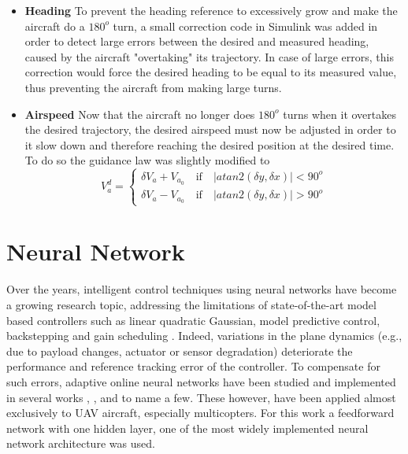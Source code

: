 \begin{itemize}
\item \textbf{Heading} To prevent the heading reference to excessively grow and make the aircraft do a $180^o$ turn, a small correction code in Simulink was added in order to detect large errors between the desired and measured heading, caused by the aircraft "overtaking" its trajectory. In case of large errors, this correction would force the desired heading to be equal to its measured value, thus preventing the aircraft from making large turns. 

\item \textbf{Airspeed} Now that the aircraft no longer does $180^o$ turns when it overtakes the desired trajectory, the desired airspeed must now be adjusted in order to it slow down and therefore reaching the desired position at the desired time. To do so the guidance law was slightly modified to 
\begin{equation}
V_a^d=\begin{cases}
\delta V_a  + V_{a_0} \quad \text{if} \quad |atan2(\delta y,\delta x)|<90^o\\
\delta V_a  - V_{a_0} \quad \text{if} \quad |atan2(\delta y,\delta x)|>90^o
\end{cases}
\label{eq:speed_guidance}
\end{equation}
\end{itemize}

\section{Neural Network}
\label{section:NN}

Over the years, intelligent control techniques using neural networks have become a growing research topic, addressing the limitations of state-of-the-art model based controllers such as linear quadratic Gaussian, model predictive control, backstepping and gain scheduling \citep{SotA_IFCS}. Indeed, variations in the plane dynamics (e.g., due to payload changes, actuator or sensor degradation) deteriorate the performance and reference tracking error of the controller. To compensate for such errors, adaptive online neural networks have been studied and implemented in several works \cite{quad_NLI+NN}, \cite{NN_PID}, \cite{UAV_adaptive} and \cite{NN_NLI} to name a few. These however, have been applied almost exclusively to UAV aircraft, especially multicopters. For this work a feedforward network with one hidden layer, one of the most widely implemented neural network architecture \cite{SotA_IFCS} was used.

